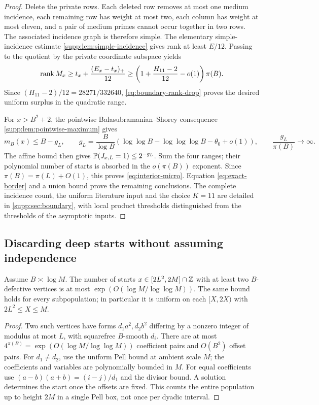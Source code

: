 \begin{proof}
Delete the private rows. Each deleted row removes at most one medium
incidence, each remaining row has weight at most two, each column has
weight at most eleven, and a pair of medium primes cannot occur together
in two rows. The associated incidence graph is therefore simple.
The elementary simple-incidence estimate \cref{supp:lem:simple-incidence}
gives rank at least $E/12$. Passing to the quotient by the private
coordinate subspace yields
\[
 \operatorname{rank} M_x\ge t_x+\frac{(E_x-t_x)_+}{12}
 \ge\left(1+\frac{H_{11}-2}{12}-o(1)\right)\pi(B).
\]
Since $(H_{11}-2)/12=28271/332640$, \eqref{eq:boundary-rank-drop} proves the desired
uniform surplus in the quadratic range.

For $x>B^2+2$, the pointwise Balasubramanian--Shorey consequence
\cref{supp:lem:pointwise-maximum} gives
\begin{equation}\label{eq:gL}
 m_B(x)\le B-g_L,\qquad
 g_L=\frac B{\log B}
   (\log\log B-\log\log\log B-\theta_0+o(1)),
 \qquad \frac{g_L}{\pi(B)}\longrightarrow\infty.
\end{equation}
The affine bound then gives $\mathbb P(J_{x,L}=1)\le2^{-g_L}$.
Sum the four ranges; their polynomial number of starts is absorbed in
the $o(\pi(B))$ exponent. Since $\pi(B)=\pi(L)+O(1)$, this proves
\eqref{eq:interior-micro}. Equation \eqref{eq:exact-border} and a union
bound prove the remaining conclusions. The complete incidence count,
the uniform literature input and the choice $K=11$ are detailed in
\cref{supp:sec:boundary}, with local product thresholds distinguished
from the thresholds of the asymptotic inputs.
\end{proof}

\subsection{Discarding deep starts without assuming independence}
\begin{lemma}
\label{lem:meso-defects}
Assume $B\asymp\log M$. The number of starts
$x\in[2L^2,2M]\cap\mathbb Z$ with at least two $B$-defective vertices is at most
$\exp(O(\log M/\log\log M))$. The same bound holds for every subpopulation;
in particular it is uniform on each $[X,2X)$ with $2L^2\le X\le M$.
\end{lemma}
\begin{proof}
Two such vertices have forms $d_1a^2,d_2b^2$ differing by a nonzero
integer of modulus at most $L$, with squarefree $B$-smooth $d_i$.
There are at most $4^{\pi(B)}=\exp(O(\log M/\log\log M))$ coefficient
pairs and $O(B^2)$ offset pairs. For $d_1\ne d_2$, use the uniform
Pell bound at ambient scale $M$; the coefficients and variables are
polynomially bounded in $M$. For equal coefficients use
$(a-b)(a+b)=(i-j)/d_1$ and the divisor bound. A solution determines the
start once the offsets are fixed. This counts the entire population up
to height $2M$ in a single Pell box, not once per dyadic interval.
\end{proof}

